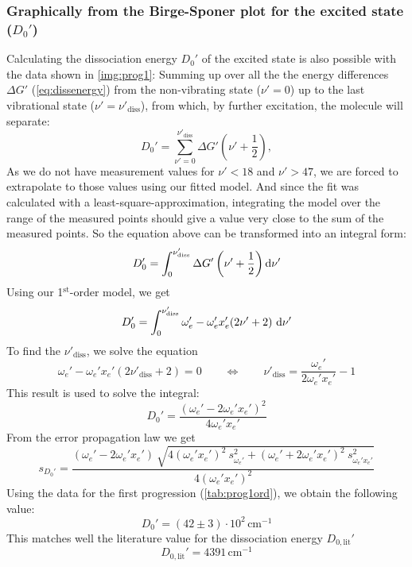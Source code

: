 \subsubsection{Graphically from the Birge-Sponer plot for the excited state ($D_0'$)}
Calculating the dissociation energy $ D_0'$ of the excited state
is also possible with the data shown in \autoref{img:prog1}:
Summing up over all the
the energy differences $\Delta G'$ (\autoref{eq:dissenergy}) from the non-vibrating state ($\nu'=0$) up to the last
vibrational state ($\nu'=\nu'_{\text{diss}}$), from which, by further excitation, the molecule will separate:
\begin{equation}
\label{eq:dissenergy2}
  D_0' = \sum_{\nu'=0}^{\nu'_{\text{diss}}} \Delta G' \left( \nu' + \frac{1}{2} \right),
\end{equation}
As we do not have measurement values for $\nu'<18$ and $\nu'>47$,
we are forced to extrapolate to those values using our fitted model.
And since the fit was calculated with a least-square-approximation,
integrating the model over the range of the measured points should give a value
very close to the sum of the measured points.
So the equation above can be transformed into an integral form:
\begin{equation}
  D_0' = \int_{0}^{\nu'_{\text{diss}}} \Delta G'\left( \nu' + \frac{1}{2} \right) \mathrm{d} \nu'
\end{equation}
Using our 1$^{\text{st}}$-order model, we get
\begin{equation}
D_0' = \int_{0}^{\nu'_{\text{diss}}} \omega_e' - \omega_e' x_e' (2\nu' + 2) \ \difd \nu'
\end{equation}
To find the $\nu'_{\text{diss}}$, we solve the equation
\begin{equation}
  \omega_e' - \omega_e' x_e' (2\nu'_{\text{diss}} + 2) = 0 \qquad \Leftrightarrow \qquad \nu'_{\text{diss}} =
  \frac{\omega_e'}{2\omega_e' x_e'} - 1
\end{equation}
This result is used to solve the integral:
\begin{equation}
  D_0' = \frac{(\omega_e'-2\omega_e' x_e')^2}{4\omega_e' x_e'}
\end{equation}
From the error propagation law we get
\begin{equation}
  s_{D_0'} = \frac
  {(\omega_e'-2\omega_e' x_e') \ \sqrt{4(\omega_e' x_e')^2 \ s_{\omega_e'}^2 + (\omega_e'+2\omega_e' x_e')^2 \ s_{\omega_e' x_e'}^2}}
  {4(\omega_e' x_e')^2}
\end{equation}
Using the data for the first progression (\autoref{tab:prog1ord}), we obtain the following value:
\begin{equation}
    D_0' = (42 \pm 3) \cdot 10^2\, \text{cm}^{-1}
    \end{equation}
This matches well the literature value \cite{steinfeld} for the dissociation energy $D_{0,\text{lit}}'$
\begin{equation}
  D_{0,\text{lit}}' = 4391 \, \text{cm}^{-1}
\end{equation}

